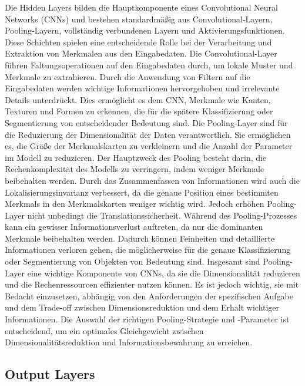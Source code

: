 Die Hidden Layers bilden die Hauptkomponente eines Convolutional Neural Networks (CNNs) und bestehen standardmäßig aus Convolutional-Layern, Pooling-Layern, vollständig verbundenen Layern und Aktivierungsfunktionen. 
Diese Schichten spielen eine entscheidende Rolle bei der Verarbeitung und Extraktion von Merkmalen aus den Eingabedaten.
Die Convolutional-Layer führen Faltungsoperationen auf den Eingabedaten durch, um lokale Muster und Merkmale zu extrahieren. Durch die Anwendung von Filtern auf die Eingabedaten werden wichtige Informationen hervorgehoben und irrelevante Details unterdrückt. 
Dies ermöglicht es dem CNN, Merkmale wie Kanten, Texturen und Formen zu erkennen, die für die spätere Klassifizierung oder Segmentierung von entscheidender Bedeutung sind.
Die Pooling-Layer sind für die Reduzierung der Dimensionalität der Daten verantwortlich. 
Sie ermöglichen es, die Größe der Merkmalskarten zu verkleinern und die Anzahl der Parameter im Modell zu reduzieren. 
Der Hauptzweck des Pooling besteht darin, die Rechenkomplexität des Modells zu verringern, indem weniger Merkmale beibehalten werden. 
Durch das Zusammenfassen von Informationen wird auch die Lokalisierungsinvarianz verbessert, da die genaue Position eines bestimmten Merkmals in den Merkmalskarten weniger wichtig wird.
Jedoch erhöhen Pooling-Layer nicht unbedingt die Translationssicherheit. Während des Pooling-Prozesses kann ein gewisser Informationsverlust auftreten, da nur die dominanten Merkmale beibehalten werden. 
Dadurch können Feinheiten und detaillierte Informationen verloren gehen, die möglicherweise für die genaue Klassifizierung oder Segmentierung von Objekten von Bedeutung sind.
Insgesamt sind Pooling-Layer eine wichtige Komponente von CNNs, da sie die Dimensionalität reduzieren und die Rechenressourcen effizienter nutzen können. 
Es ist jedoch wichtig, sie mit Bedacht einzusetzen, abhängig von den Anforderungen der spezifischen Aufgabe und dem Trade-off zwischen Dimensionsreduktion und dem Erhalt wichtiger Informationen. 
Die Auswahl der richtigen Pooling-Strategie und -Parameter ist entscheidend, um ein optimales Gleichgewicht zwischen Dimensionalitätsreduktion und Informationsbewahrung zu erreichen.

\subsection{Output Layers}

